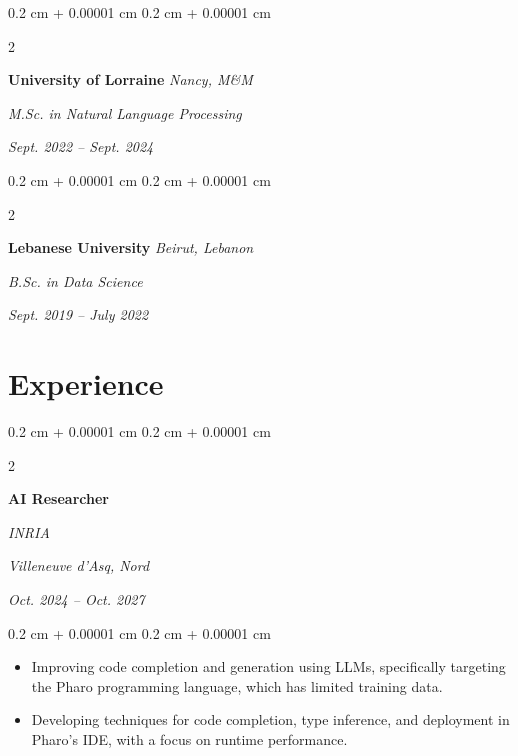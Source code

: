 \documentclass[10pt, letterpaper]{article}
\newenvironment{highlights}{
    \begin{itemize}[
        topsep=0.10 cm,
        parsep=0.10 cm,
        partopsep=0pt,
        itemsep=0pt,
        leftmargin=0.4 cm + 10pt
    ]
}{
    \end{itemize}
} %
\newenvironment{onecolentry}{
    \begin{adjustwidth}{
        0.2 cm + 0.00001 cm
    }{
        0.2 cm + 0.00001 cm
    }
}{
    \end{adjustwidth}
} %
\newenvironment{twocolentry}[2][]{
    \onecolentry
    \def\secondColumn{#2}
    \setcolumnwidth{\fill, 4.5 cm}
    \begin{paracol}{2}
}{
    \switchcolumn \raggedleft \secondColumn
    \end{paracol}
    \endonecolentry
} %
\begin{document}
        \begin{twocolentry}{
            \textit{Sept. 2022 – Sept. 2024}}
            \textbf{University of Lorraine}
            \textit{Nancy, M\&M}

            \textit{M.Sc. in Natural Language Processing}
        \end{twocolentry}
        \vspace{0.10 cm}

        \begin{twocolentry}{
            \textit{Sept. 2019 – July 2022}}
            \textbf{Lebanese University}
            \textit{Beirut, Lebanon}

            \textit{B.Sc. in Data Science}
        \end{twocolentry}

        \vspace{0.10 cm}

    \section{Experience}


        \begin{twocolentry}{
            \textit{Villeneuve d'Asq, Nord}    
                
            \textit{Oct. 2024 – Oct. 2027}}
                \textbf{AI Researcher}
                
                \textit{INRIA}
        \end{twocolentry} 

        \vspace{0.10 cm}
        \begin{onecolentry}
            \begin{highlights}
                \item Improving code completion and generation using LLMs, specifically targeting the Pharo programming language, which has limited training data. 
                \item Developing techniques for code completion, type inference, and deployment in Pharo’s IDE, with a focus on runtime performance.
            \end{highlights}
        \end{onecolentry}
        \vspace{0.2 cm}
\end{document}
